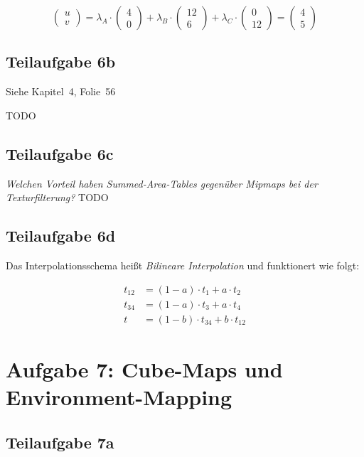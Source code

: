 \documentclass[a4paper]{scrartcl}
\begin{document}
\begin{equation}
\begin{pmatrix}u\\v\end{pmatrix} = \lambda_A \cdot \begin{pmatrix}4\\0\end{pmatrix} + \lambda_B \cdot \begin{pmatrix}12\\6\end{pmatrix} + \lambda_C \cdot \begin{pmatrix}0\\12\end{pmatrix} = \begin{pmatrix}4\\5\end{pmatrix}
\end{equation}


\subsection*{Teilaufgabe 6b}
Siehe Kapitel~4, Folie~56

TODO


\subsection*{Teilaufgabe 6c}
\textit{Welchen Vorteil haben Summed-Area-Tables gegenüber Mipmaps bei der Texturfilterung?}
TODO

\subsection*{Teilaufgabe 6d}
Das Interpolationsschema heißt \textit{Bilineare Interpolation} und funktionert
wie folgt:

\begin{align}
    t_{12} &= (1-a) \cdot t_1 + a \cdot t_2\\
    t_{34} &= (1-a) \cdot t_3 + a \cdot t_4\\
    t      &= (1-b) \cdot t_{34} + b \cdot t_{12}
\end{align}

\section*{Aufgabe 7: Cube-Maps und Environment-Mapping}
\subsection*{Teilaufgabe 7a}
\end{document}
